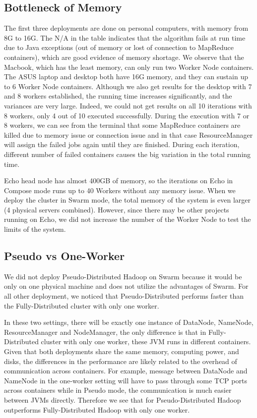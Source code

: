 \subsection{Bottleneck of Memory} 

The first three deployments are done on personal computers, with
memory from 8G to 16G. The N/A in the table indicates that the
algorithm fails at run time due to Java exceptions (out of memory or
lost of connection to MapReduce containers), which are good evidence
of memory shortage. We observe that the Macbook, which has the least
memory, can only run two Worker Node containers. The ASUS laptop and
desktop both have 16G memory, and they can sustain up to 6 Worker Node
containers. Although we also get results for the desktop with 7 and 8
workers established, the running time increases significantly, and the
variances are very large. Indeed, we could not get results on all 10
iterations with 8 workers, only 4 out of 10 executed
successfully. During the execution with 7 or 8 workers, we can see
from the terminal that some MapReduce containers are killed due to
memory issue or connection issue and in that case ResourceManager will
assign the failed jobs again until they are finished. During each
iteration, different number of failed containers causes the big
variation in the total running time.

Echo head node has almost 400GB of memory, so the iterations on 
Echo in Compose mode runs up to 40 Workers without any memory issue. 
When we deploy the cluster in Swarm mode, the total memory of the system 
is even larger (4 physical servers combined). However, since there may be 
other projects running on Echo, we did not increase the number of the 
Worker Node to test the limits of the system. 

\subsection{Pseudo vs One-Worker} 

We did not deploy Pseudo-Distributed Hadoop on Swarm because it would 
be only on one physical machine and does not utilize the advantages of 
Swarm. For all other deployment, we noticed that Pseudo-Distributed 
performs faster than the Fully-Distributed cluster with only one worker.

In these two settings, there will be exactly one instance of DataNode,
NameNode, ResourceManager and NodeManager, the only difference is that
in Fully-Distributed cluster with only one worker, these JVM runs in
different containers. Given that both deployments share the same
memory, computing power, and disks, the differences in the performance
are likely related to the overhead of communication across
containers. For example, message between DataNode and NameNode in the
one-worker setting will have to pass through some TCP ports across
containers while in Pseudo mode, the communication is much easier
between JVMs directly. Therefore we see that for Pseudo-Distributed
Hadoop outperforms Fully-Distributed Hadoop with only one worker.


